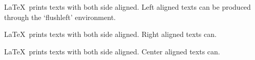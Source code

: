 \documentclass[11pt,a4paper]{article}
\begin{document}
    \begin{flushleft}
    \LaTeX\ prints texts with both side aligned.
    Left aligned texts can be produced through
    the ‘flushleft’ environment.
    \end{flushleft}
    \begin{flushright}
        \LaTeX\ prints texts with both side aligned.
        Right aligned texts can.
    \end{flushright}
    \begin{center}
        \LaTeX\ prints texts with both side aligned.
        Center aligned texts can.
    \end{center}
\end{document}

